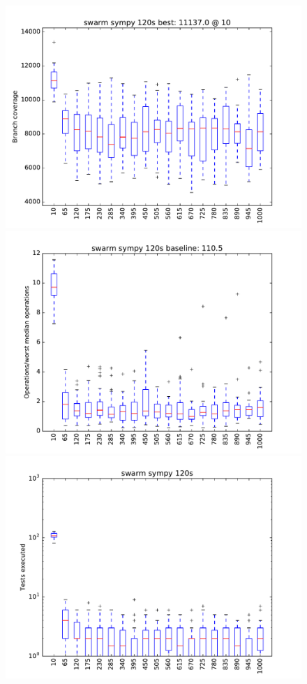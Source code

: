 \begin{figure}
\includegraphics[width=\columnwidth]{graphs/sympyswarm120}
\includegraphics[width=\columnwidth]{graphs/opssympyswarm120}
\includegraphics[width=\columnwidth]{graphs/execsympyswarm120}
\end{figure}

